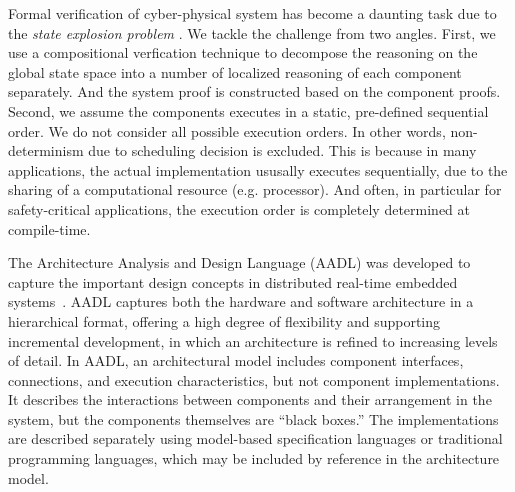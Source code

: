 
Formal verification of cyber-physical system has become a daunting task due to the \emph{state explosion problem} \cite{Clarke2012}. We tackle the challenge from two angles. First, we use a compositional verfication technique to decompose the reasoning on the global state space into a number of localized reasoning of each component separately. And the system proof is constructed based on the component proofs. Second, we assume the components executes in a static, pre-defined sequential order. We do not consider all possible execution orders. In other words, non-determinism due to scheduling decision is excluded. This is because in many applications, the actual implementation ususally executes sequentially, due to the sharing of a computational resource (e.g. processor). And often, in particular for safety-critical applications, the execution order is completely determined at compile-time. 

The Architecture Analysis and Design Language (AADL) was developed to capture the important design concepts in distributed real-time embedded systems~\cite{FeilerModelBasedEngineering2012}. 
AADL captures both the hardware and software architecture in a hierarchical format,  
offering a high degree of flexibility and supporting incremental development, in which an architecture is refined to increasing levels of detail.
%
In AADL, an architectural model includes component interfaces, connections, and execution characteristics, but not component implementations. It describes the interactions between components and their arrangement in the system, but the components themselves are ``black boxes.'' The implementations are described separately using model-based specification languages or traditional programming languages, which may be included by reference in the architecture model.  

